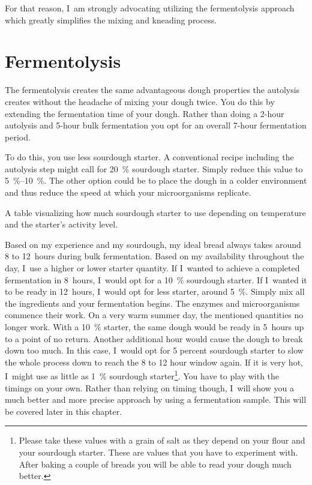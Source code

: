For that reason, I~am strongly advocating utilizing the fermentolysis approach
which greatly simplifies the mixing and kneading process.

\section{Fermentolysis}%
\label{section:fermentolysis}

The fermentolysis creates the same advantageous dough properties the
autolysis creates without the headache of mixing your dough twice. You do this
by extending the fermentation time of your dough. Rather than doing a 2-hour
autolysis and 5-hour bulk fermentation you opt for an overall 7-hour
fermentation period.

To do this, you use less sourdough starter. A conventional recipe including the
autolysis step might call for \qty{20}{\percent} sourdough starter. Simply reduce this
value to \qtyrange{5}{10}{\percent}. The other option could be to place the dough in a colder
environment and thus reduce the speed at which your microorganisms replicate.

\begin{table}[!htb]
    \centering
        
        \caption[Quantity of sourdough]{A table visualizing how much sourdough
            starter to use depending on temperature and the starter's activity
            level.}
\end{table}

Based on my experience and my sourdough, my ideal bread always takes around 8
to 12~hours during bulk fermentation. Based on my availability throughout
the day, I~use a higher or lower starter quantity. If I~wanted to achieve a completed
fermentation in 8~hours, I~would opt for a \qty{10}{\percent} sourdough starter. If
I~wanted it to be ready in 12~hours, I~would opt for less starter, around \qty{5}{\percent}.
Simply mix all the ingredients and your fermentation begins. The
enzymes and microorganisms commence their work. On a very warm summer day, the
mentioned quantities no longer work. With a \qty{10}{\percent} starter, the same dough
would be ready in 5~hours up to a point of no return. Another additional hour
would cause the dough to break down too much. In this case, I~would opt for 5
percent sourdough starter to slow the whole process down to reach the 8 to 12
hour window again. If it is very hot, I~might use as little as \qty{1}{\percent}
sourdough starter\footnote{Please take these values with a grain of salt as
they depend on your flour and your sourdough starter. These are values that
you have to experiment with. After baking a couple of breads you will be able
to read your dough much better.}. You have to play with the timings on your own.
Rather than relying on timing though, I~will show you a much better and more precise approach
by using a fermentation sample. This will be covered later in this chapter.

